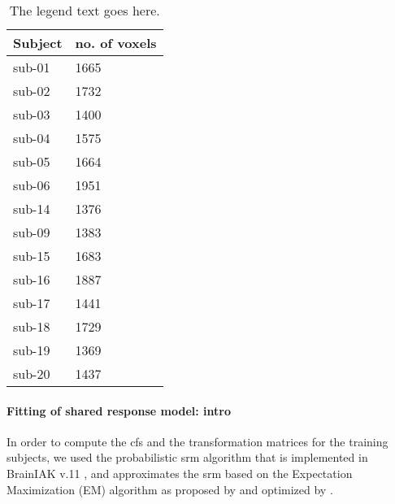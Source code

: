 

\begin{table*}[btp]
    \caption{
    \textbf{Table heading.}
    Number of remaining voxels after time series data of each paradigm
    and subject were masked with the union of individual \acp{ppa} that was
    warped from MNI space into each individual's subjects-space and the
    subject-specific field of view of audio-description.}

\label{tab:ppamaskvoxels}
\begin{tabular}{ll}
    \toprule
    \textbf{Subject} & \textbf{no. of voxels} \\
    \midrule
    sub-01 & 1665 \tabularnewline
    sub-02 & 1732 \tabularnewline
    sub-03 & 1400 \tabularnewline
    sub-04 & 1575 \tabularnewline
    sub-05 & 1664 \tabularnewline
    sub-06 & 1951 \tabularnewline
    sub-14 & 1376 \tabularnewline
    sub-09 & 1383 \tabularnewline
    sub-15 & 1683 \tabularnewline
    sub-16 & 1887 \tabularnewline
    sub-17 & 1441 \tabularnewline
    sub-18 & 1729 \tabularnewline
    sub-19 & 1369 \tabularnewline
    sub-20 & 1437 \tabularnewline
    \bottomrule
\end{tabular}
\caption*{The legend text goes here.}
\end{table*}


\paragraph{Fitting of shared response model: intro}



In order to compute the \ac{cfs} and the transformation matrices for the
training subjects, we used the probabilistic \ac{srm} algorithm that is
implemented in BrainIAK v.11 \citep[Brain Imaging Analysis
Kit;][]{kumar2020brainiak, kumar2020brainiaktutorial}, and approximates the
\ac{srm} based on the Expectation Maximization (EM) algorithm as proposed by
\citet{chen2015reduced} and optimized by \citet{anderson2016enabling}.

